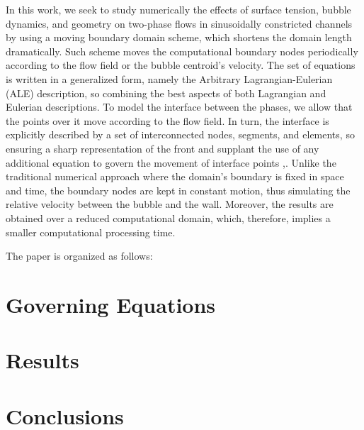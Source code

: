 \documentclass[12pt,fleqn]{article}
\begin{document}
In this work, we seek to study numerically the effects of surface
tension, bubble dynamics, and geometry on two-phase flows in
sinusoidally constricted channels by using a moving boundary domain scheme,
which shortens the domain length dramatically. Such scheme moves the
computational boundary nodes periodically according to the flow field or
the bubble centroid's velocity. The set of equations is written in a
generalized form, namely the Arbitrary Lagrangian-Eulerian (ALE)
description, so combining the best aspects of both Lagrangian and
Eulerian descriptions. To model the interface between the phases, we
allow that the points over it move according to the flow field. In turn, 
the interface is explicitly described by a set of interconnected nodes, 
segments, and elements, so ensuring a sharp representation of the
front and supplant the use of any additional equation to govern the
movement of interface points \cite{anjos2012},\cite{anjos2014}. 
Unlike the traditional numerical approach where the domain's boundary 
is fixed in space and time, the boundary nodes are kept in constant motion, 
thus simulating the relative velocity between the bubble and the wall. 
Moreover, the results are obtained over a reduced computational domain,
which, therefore, implies a smaller computational processing time.

The paper is organized as follows:


\section{Governing Equations}
\section{Results}
\section{Conclusions}



\end{document}
